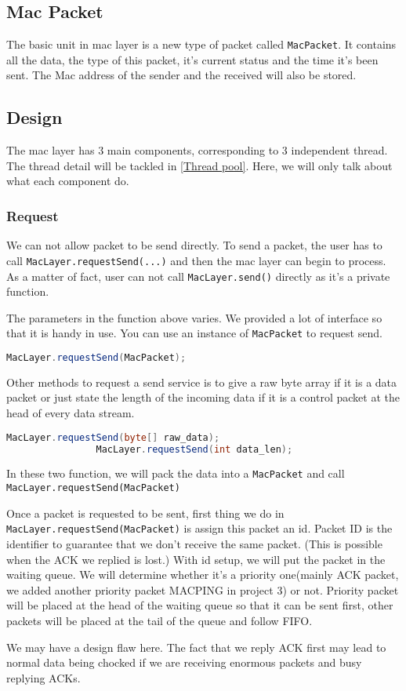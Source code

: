 \documentclass[conference,compsoc]{IEEEtran}
\begin{document}
	\subsection{Mac Packet}
		The basic unit in mac layer is a new type of packet called \lstinline{MacPacket}. It contains all the data, the type of this packet, it's current status and the time it's been sent. The Mac address of the sender and the received will also be stored.

	\subsection{Design}
		The mac layer has 3 main components, corresponding to 3 independent thread. The thread detail will be tackled in \ref{Thread pool}. Here, we will only talk about what each component do.
		\subsubsection{Request}
			We can not allow packet to be send directly. To send a packet, the user has to call \lstinline{MacLayer.requestSend(...)} and then the mac layer can begin to process. As a matter of fact, user can not call \lstinline{MacLayer.send()} directly as it's a private function.
			\par
			The parameters in the function above varies. We provided a lot of interface so that it is handy in use. You can use an instance of \lstinline{MacPacket} to request send. 
			\begin{lstlisting}[linewidth=\columnwidth,language=Java]
				MacLayer.requestSend(MacPacket);
			\end{lstlisting}
			\par
			Other methods to request a send service is to give a raw byte array if it is a data packet or just state the length of the incoming data if it is a control packet at the head of every data stream.
			\begin{lstlisting}[linewidth=\columnwidth,language=Java]
				MacLayer.requestSend(byte[] raw_data);
				MacLayer.requestSend(int data_len);
			\end{lstlisting}
			In these two function, we will pack the data into a \lstinline{MacPacket} and call \lstinline{MacLayer.requestSend(MacPacket)}
			\par
			Once a packet is requested to be sent, first thing we do in \lstinline{MacLayer.requestSend(MacPacket)} is assign this packet an id. 
			Packet ID is the identifier to guarantee that we don't receive the same packet.
			(This is possible when the ACK we replied is lost.)
			With id setup, we will put the packet in the waiting queue. We will determine whether it's a priority one(mainly ACK packet, we added another priority packet MACPING in project 3) or not. 
			Priority packet will be placed at the head of the waiting queue so that it can be sent first, other packets will be placed at the tail of the queue and follow FIFO. 
			\par
			We may have a design flaw here. 
			The fact that we reply ACK first may lead to normal data being chocked if we are receiving enormous packets and busy replying ACKs.
\end{document}
